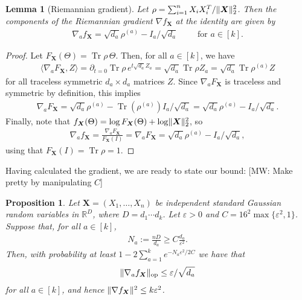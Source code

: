 \documentclass{article}
\newtheorem{prop}[theorem]{Proposition}
\newtheorem{lemma}[theorem]{Lemma}
\DeclarePairedDelimiter{\norm}{\lVert}{\rVert}
\newcommand{\R}{{\mathbb{R}}}
\newcommand{\op}{\operatorname{op}}
\renewcommand{\vec}{\bm}
\newcommand\eps{\varepsilon}
\newcommand\tr{\operatorname{Tr}}
\newcommand{\MW}[1]{{\color{red}[MW: #1]}}
\begin{document}
\begin{lemma}[Riemannian gradient]\label{lem:gradient}
Let $\rho = \sum_{i=1}^n X_i X_i^T / \norm{\vec X}_2^2$.
Then the components of the Riemannian gradient $\nabla f_{\vec X}$ at the identity are given by
\begin{align*}
  \nabla_a f_{\vec X} = \sqrt{d_a} \rho^{(a)} - I_a/\sqrt{d_a} \qquad \text{ for } a \in [k].
\end{align*}
\end{lemma}
\begin{proof}
  Let $F_{\vec X}(\Theta) = \tr \rho \, \Theta$.
  Then, for all $a\in[k]$, we have
  \begin{align*}
   \langle \nabla_a F_{\vec X} , Z \rangle
  = \partial_{t=0} \tr \rho \, e^{t \sqrt{d_a} Z_a}
  = \sqrt{d_a} \tr \rho Z_a
  = \sqrt{d_a} \tr \rho^{(a)} Z
  \end{align*}
  for all traceless symmetric $d_a \times d_a$ matrices $Z$.
  Since $\nabla_a F_{\vec X}$ is traceless and symmetric by definition, this implies
  \begin{align*}
    \nabla_a F_{\vec X}
  = \sqrt{d_a} \rho^{(a)} - \tr(\rho^{(a)}) I_a /\sqrt{d_a}
  = \sqrt{d_a} \rho^{(a)} - I_a/\sqrt{d_a}.
  \end{align*}
  Finally, note that $f_{\vec X}(\Theta) = \log F_{\vec X}(\Theta) + \log \norm{\vec X}_2^2$, so
  \begin{align*}
    \nabla_a f_{\vec X}
  = \frac{\nabla_a F_{\vec X}}{F_{\vec X}(I)}
  = \nabla_a F_{\vec X}
  = \sqrt{d_a} \rho^{(a)} - I_a/\sqrt{d_a},
  \end{align*}
  using that $F_{\vec X}(I) = \tr \rho = 1$.
\end{proof}

Having calculated the gradient, we are ready to state our bound:
\MW{Make pretty by manipulating $C$}
\begin{prop}\label{prop:gradient-bound}
Let $\vec X = (X_1,\dots,X_n)$ be independent standard Gaussian random variables in $\R^D$, where $D=d_1\cdots{}d_k$.
Let $\eps>0$ and $C = 16^2\max\{\eps^2,1\}$.
Suppose that, for all $a \in [k]$,
\begin{align*}
  N_a := \frac{n D}{d_a} \geq C \frac{d_a}{\eps^2}.
\end{align*}
Then, with probability at least $1 - 2 \sum_{a=1}^k e^{-N_a \eps^2/2C}$ we have that
\begin{align*}
  \norm{\nabla_a f_{\vec X}}_{\op} \leq \eps/\sqrt{d_a}
\end{align*}
for all $a\in[k]$, and hence $\norm{\nabla f_{\vec X}}^2 \leq k \eps^2$.
\end{prop}
\end{document}
